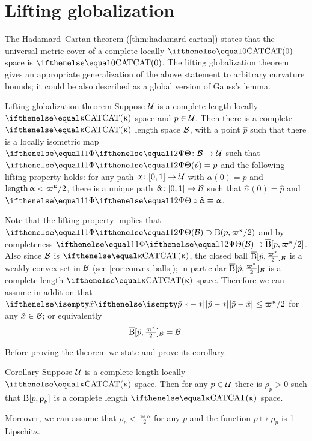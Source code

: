 \section{Lifting globalization}\label{sec:cat-globalize}

The Hadamard--Cartan theorem (\ref{thm:hadamard-cartan}) states that 
the universal metric cover of a complete locally $\CAT0$ space is $\CAT0$.
The lifting globalization theorem gives an appropriate generalization of the above statement to arbitrary curvature bounds;
it could be also described as a global version of Gauss's lemma.



\begin{thm}{Lifting globalization theorem}
\label{thm:globalization-lift}
Suppose $\mathcal{U}$ is a complete length locally $\CAT\kappa$ space and  $p\in\spc{U}$.
Then there is a complete $\CAT\kappa$ length space $\mathcal{B}$, 
with a point $\hat p$ such that 
there is a locally isometric map $\map\:\spc{B}\to\spc{U}$
such that $\map(\hat p)=p$ and the following lifting property holds: 
for any path $\alpha\:[0,1]\to\spc{U}$ with $\alpha(0)=p$ and $\length\alpha<\varpi\kappa/2$, 
there is a unique path $\hat\alpha \:[0,1]\to \spc{B}$ such that $\hat\alpha(0)=\hat p$ 
and $\map\circ\hat\alpha\equiv\alpha$.
\end{thm}


Note that the lifting property implies that $\map(\spc{B})\supset\oBall(p,\varpi\kappa/2)$ and by completeness $\map(\spc{B})\supset\cBall[p,\varpi\kappa/2]$.
Also since $\mathcal{B}$ is $\CAT\kappa$, the closed ball $\cBall[\hat p,\tfrac{\varpi\kappa}2]_{\spc{B}}$ is a weakly convex set in $\mathcal{B}$ (see \ref{cor:convex-balls});
in particular $\cBall[\hat p,\tfrac{\varpi\kappa}2]_{\spc{B}}$ is a complete length $\CAT\kappa$ space.
Therefore we can assume in addition that $\dist{\hat p}{\hat x}{}\le \varpi\kappa/2$ for any $\hat x\in\spc{B}$;
or equivalently
\[\cBall[\hat p,\tfrac{\varpi\kappa}2]_{\spc{B}}=\spc{B}.\]


Before proving the theorem we state and prove its corollary.

\begin{thm}{Corollary}\label{cor:loc-CAT(k)}
Suppose $\mathcal{U}$ is a complete length locally $\CAT\kappa$ space.
Then for any $p\in\spc{U}$ there is $\rho_p>0$
such that $\overline{\mathrm{B}}{}[p,\upvarrho_p]$ is a complete length $\CAT\kappa$ space.

Moreover, we can assume that $\rho_p<\tfrac{\varpi\kappa}2$
for any $p$ and the function $p\mapsto\rho_p$ is 1-Lipschitz.
\end{thm}

